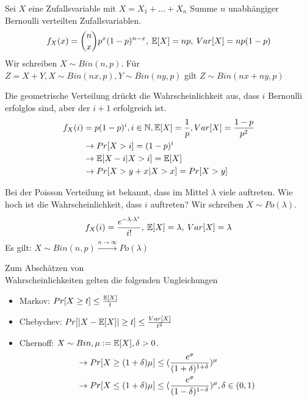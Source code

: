 \begin{definition}
	Sei $X$ eine Zufallsvariable mit $X=X_1 + ... + X_n$ Summe $n$ unabhängiger Bernoulli verteilten Zufallsvariablen.
	\begin{align*}
	f_X(x) = \binom{n}{x} p^x (1-p)^{n-x}, \medspace \mathbb{E}[X] = np, \medspace Var[X] = np(1-p)
	\end{align*}
	Wir schreiben $X \sim Bin(n,p)$. Für $Z = X + Y, X \sim Bin(nx, p), Y \sim Bin(ny, p)$ gilt $Z \sim Bin(nx + ny, p)$ 
\end{definition}

\begin{definition}
	Die geometrische Verteilung drückt die Wahrscheinlichkeit aus, dass $i$ Bernoulli erfolglos sind, aber der $i+1$ erfolgreich ist. 
	\begin{align*}
	f_X(i) &= p(1-p)^i, i \in \mathbb{N}, \mathbb{E}[X] = \frac{1}{p}, Var[X] = \frac{1 - p}{p^2} \\
	&\rightarrow Pr[X > i] = (1-p)^i \\
	&\rightarrow \mathbb{E}[X - i | X > i] = \mathbb{E}[X] \\
	&\rightarrow Pr[X > y + x | X > x] = Pr[X > y]
	\end{align*}
\end{definition}

\begin{definition}
	Bei der Poisson Verteilung ist bekannt, dass im Mittel $\lambda$ viele auftreten. Wie hoch ist die Wahrscheinlichkeit, dass $i$ auftreten? Wir schreiben $X \sim Po(\lambda)$.
	\begin{align*}
		f_X(i) = \frac{e^{-\lambda \cdot \lambda^i}}{i!}, \medspace \mathbb{E}[X] = \lambda, \medspace Var[X] = \lambda
	\end{align*}
	Es gilt: $X \sim Bin(n,p) \overset{n \rightarrow \infty}{\rightarrow} Po(\lambda)$
\end{definition}

\begin{satz}
	Zum Abschätzen von \\ Wahrscheinlichkeiten gelten die folgenden Ungleichungen
	\begin{itemize}[noitemsep]
		\item Markov: $Pr[X \geq t] \leq \frac{\mathbb{E}[X]}{t}$
		\item Chebychev: $Pr[|X - \mathbb{E}[X]| \geq t] \leq \frac{Var[X]}{t^2}$
		\item Chernoff: $X \sim Bin, \mu := \mathbb{E}[X], \delta > 0$.
			\begin{align*}
				&\rightarrow Pr[X \geq (1 + \delta) \mu] \leq (\frac{e^\sigma}{(1+\delta)^{1+\delta}})^\mu \\
				&\rightarrow Pr[X \leq (1 + \delta) \mu] \leq (\frac{e^\sigma}{(1-\delta)^{1-\delta}})^\mu, \delta \in (0,1)
			\end{align*}
	\end{itemize}
\end{satz}

